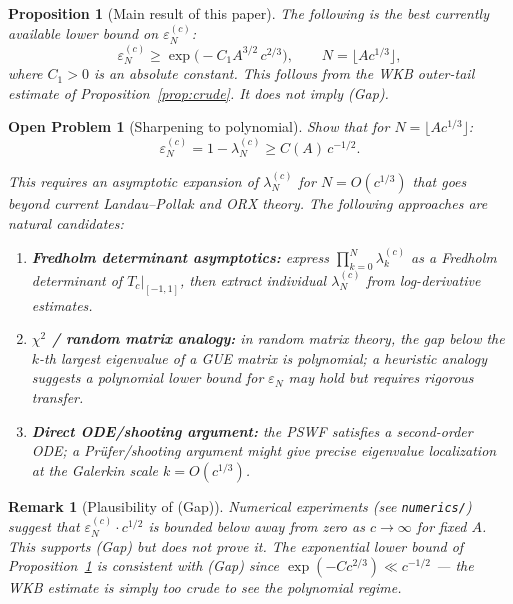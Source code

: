 \documentclass[12pt,a4paper]{article}
\newtheorem{proposition}[theorem]{Proposition}
\newtheorem{remark}[theorem]{Remark}
\newtheorem{openproblem}[theorem]{Open Problem}
\newcommand{\lam}[1]{\lambda_{#1}^{(c)}}
\newcommand{\Tc}{T_c}
\begin{document}
\begin{proposition}[Main result of this paper]
\label{prop:main}
The following is the best currently available lower bound
on $\varepsilon_N^{(c)}$:
\[
  \varepsilon_N^{(c)} \geq \exp\!\bigl(-C_1 A^{3/2}\, c^{2/3}\bigr),
  \qquad N = \lfloor Ac^{1/3}\rfloor,
\]
where $C_1 > 0$ is an absolute constant.
This follows from the WKB outer-tail estimate of
Proposition~\ref{prop:crude}.
It does not imply (Gap).
\end{proposition}

\begin{openproblem}[Sharpening to polynomial]
\label{op:sharpening}
Show that for $N = \lfloor Ac^{1/3}\rfloor$:
\[
  \varepsilon_N^{(c)} = 1 - \lam{N} \geq C(A)\,c^{-1/2}.
\]

\medskip\noindent
This requires an asymptotic expansion of $\lam{N}$
for $N = O(c^{1/3})$ that goes beyond current
Landau--Pollak and ORX theory.
The following approaches are natural candidates:
\begin{enumerate}[nosep]
  \item \textbf{Fredholm determinant asymptotics:}
        express $\prod_{k=0}^{N}\lam{k}$ as a Fredholm
        determinant of $\Tc|_{[-1,1]}$,
        then extract individual $\lam{N}$ from
        log-derivative estimates.
  \item \textbf{$\chi^2$ / random matrix analogy:}
        in random matrix theory, the gap below the
        $k$-th largest eigenvalue of a GUE matrix
        is polynomial; a heuristic analogy suggests
        a polynomial lower bound for $\varepsilon_N$
        may hold but requires rigorous transfer.
  \item \textbf{Direct ODE/shooting argument:}
        the PSWF satisfies a second-order ODE;
        a Pr\"ufer/shooting argument might give
        precise eigenvalue localization at the
        Galerkin scale $k = O(c^{1/3})$.
\end{enumerate}
\end{openproblem}

\begin{remark}[Plausibility of (Gap)]
\label{rem:plausibility}
Numerical experiments (see \texttt{numerics/}) suggest
that $\varepsilon_N^{(c)} \cdot c^{1/2}$ is
\emph{bounded below away from zero} as $c \to \infty$
for fixed $A$.
This supports (Gap) but does not prove it.
The exponential lower bound of Proposition~\ref{prop:main}
is consistent with (Gap) since
$\exp(-Cc^{2/3}) \ll c^{-1/2}$
--- the WKB estimate is simply too crude to see
the polynomial regime.
\end{remark}
\end{document}
